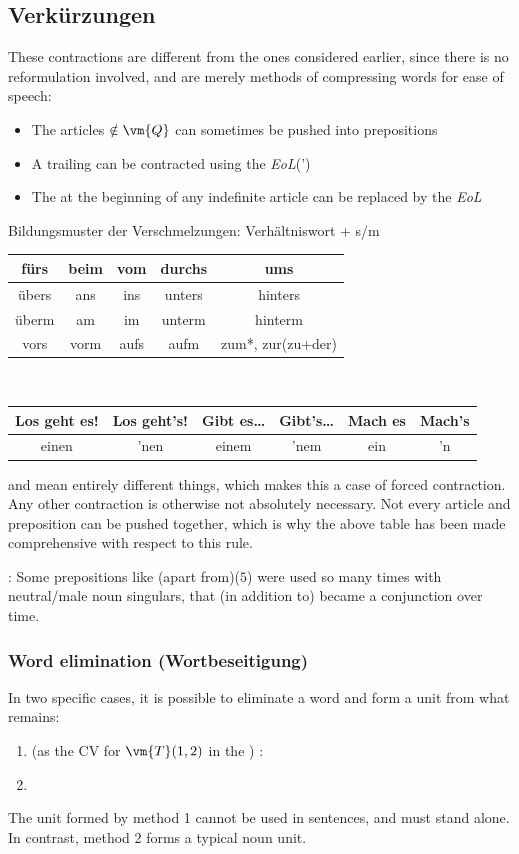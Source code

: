 \subsection[Contractions]{Verkürzungen}
These contractions are different from the ones considered earlier, since there is no reformulation  involved, and are merely methods of compressing  words  for ease of speech:
\begin{itemize}
\item The articles   $\notin\vm{Q}$ can sometimes be pushed into prepositions
\item A trailing  can be contracted using  the \textit{EoL}(')
\item The  at the beginning of any indefinite article can be replaced by the \textit{EoL}
\end{itemize}
\begin{setdef}
    Bildungsmuster der Verschmelzungen: Verhältniswort + s/m\\
    \begin{tabular}{c|c|c|c|c}
        \hline fürs & beim & vom & durchs & ums\\\hline\hline übers & ans & ins & unters & hinters\\\hline überm & am & im & unterm & hinterm\\\hline
        vors & vorm & aufs & aufm & zum*, zur(zu+der)\\\hline
    \end{tabular}\\\begin{tabular}{cc|cc|cc}
        \hline Los geht es! & Los geht's! & Gibt es\ldots & Gibt's\ldots & Mach es & Mach's\\\hline
        einen & 'nen & einem & 'nem & ein & 'n
    \end{tabular}
\end{setdef}
 and  mean entirely different things, which makes this a case of forced contraction. Any other contraction is otherwise not absolutely necessary.
Not every article and preposition can be pushed together, which is why  the above table has been made comprehensive with respect to this rule.

: Some prepositions like (apart from)($5$) were used so many times with neutral/male noun singulars, that (in addition to) became a conjunction over time.
\subsubsection{Word elimination (Wortbeseitigung)}
In two specific cases, it is possible to eliminate a word and form a  unit from what remains:
\begin{enumerate}
    \item {} (as the CV for $\vm{T}(1,2)$ in the ) : 
    \item {}
\end{enumerate}
The unit formed by method 1 cannot be used in sentences, and must stand alone. In contrast, method 2 forms a typical noun unit.
